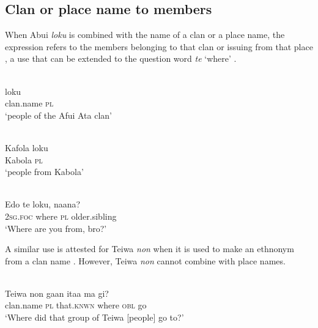 \subsection{Clan or place name to members}
When Abui \textit{loku} is combined with the name of a clan or a place name, the expression refers to the members belonging to that clan  or issuing from that place , a use that can be extended to the question word \textit{te} `where' .


\ea%
\label{ex:9:79}
 \\
 loku \\
   clan.name \textsc{pl}  \\
\glt `people of the Afui Ata clan'
\z







\ea%
\label{ex:9:80}
 \\
\gll  Kafola  loku \\
    Kabola  \textsc{pl} \\
\glt `people from Kabola'
\z







\ea%
\label{ex:9:81}
 \\
\gll  Edo te loku, {naana?}\\
   \textsc{2sg.foc} where \textsc{pl} older.sibling \\
\glt `Where are you from, bro?'
\z






A similar use is attested for Teiwa \textit{non} when it is used to make an ethnonym from a clan name . However, Teiwa \textit{non} cannot combine with place names.


\ea%
\label{ex:9:82}
 \\
\gll  Teiwa non ga{{\textglotstop}}{an} {ita}{{\textglotstop}}{a} ma gi? \\
   clan.name \textsc{pl} that.\textsc{knwn} where \textsc{obl} go  \\
\glt `Where did that group of Teiwa [people] go to?'
\z






